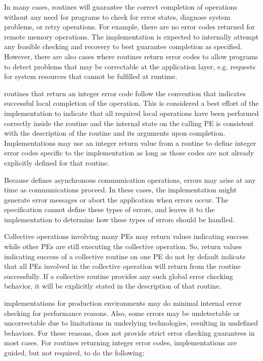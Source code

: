 In many cases, \openshmem routines will guarantee the correct completion of operations without any need for programs to check for error states, diagnose system problems, or retry operations. For example, there are no error codes returned for remote memory operations. The implementation is expected to internally attempt any feasible checking and recovery to best guarantee completion as specified. However, there are also cases where routines return error codes to allow programs to detect problems that may be correctable at the application layer, e.g. requests for system resources that cannot be fulfilled at runtime.

\CorCpp routines that return an integer error code follow the convention that  indicates successful local completion of the operation. This is considered a best effort of the implementation to indicate that all required local operations have been performed correctly inside the routine and the internal \openshmem state on the calling \ac{PE} is consistent with the description of the routine and its arguments upon completion. Implementations may use an integer return value from a routine to define integer error codes specific to the implementation as long as those codes are not already explicitly defined for that routine.

Because \openshmem defines asynchronous communication operations, errors may arise at any time as communications proceed. In these cases, the implementation might generate error messages or abort the application when errors occur. The \openshmem specification cannot define these types of errors, and leaves it to the implementation to determine how these types of errors should be handled.

Collective operations involving many \acp{PE} may return values indicating success while other \acp{PE} are still executing the collective operation. So, return values indicating success of a collective routine on one \ac{PE} do not by default indicate that all \acp{PE} involved in the collective operation will return from the routine successfully. If a collective routine provides any such global error checking behavior, it will be explicitly stated in the description of that routine.

\openshmem implementations for production environments may do minimal internal error checking for performance reasons. Also, some errors may be undetectable or uncorrectable due to limitations in underlying technologies, resulting in undefined behaviors. For these reasons, \openshmem does not provide strict error checking guarantees in most cases. For \CorCpp routines returning integer error codes, implementations are guided, but not required, to do the following:

